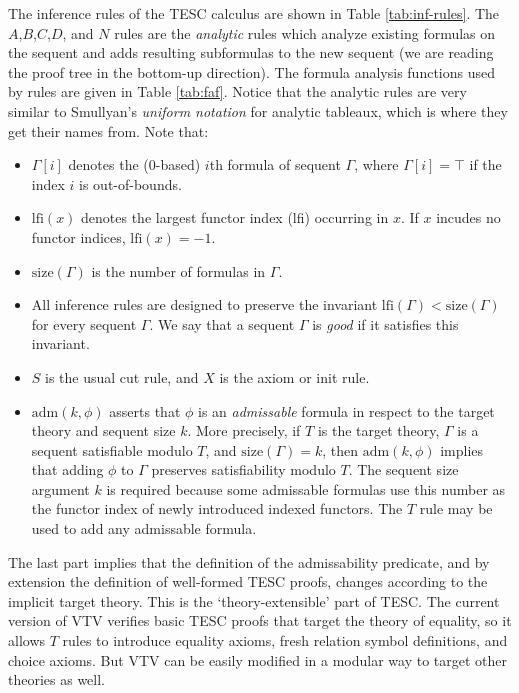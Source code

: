 \documentclass[12pt]{article}
\newcommand{\lfi}[0]{\mathrm{lfi}}
\newcommand{\size}[0]{\mathrm{size}}
\newcommand{\adm}[0]{\mathrm{adm}}
\begin{document}
The inference rules of the TESC calculus are shown in Table \ref{tab:inf-rules}.
The $A$,$B$,$C$,$D$, and $N$ rules are the \textit{analytic} rules which analyze  
existing formulas on the sequent and adds resulting subformulas to the new 
sequent (we are reading the proof tree in the bottom-up direction).
The formula analysis functions used by rules are given in Table 
\ref{tab:faf}. Notice that the analytic rules are very similar to 
Smullyan's \textit{uniform notation} for analytic tableaux, which is where 
they get their names from. Note that: 
\begin{itemize}
  \item $\Gamma[i]$ denotes the (0-based) $i$th formula of sequent $\Gamma$, 
    where $\Gamma[i] = \top$ if the index $i$ is out-of-bounds. 
  \item $\lfi(x)$ denotes the largest functor index (lfi) occurring in $x$. 
    If $x$ incudes no functor indices, $\lfi(x) = -1$.
  \item $\size(\Gamma)$ is the number of formulas in $\Gamma$.
  \item All inference rules are designed to preserve the invariant
    $\lfi(\Gamma) < \size(\Gamma)$ for every sequent $\Gamma$. We say that 
    a sequent $\Gamma$ is \textit{good} if it satisfies this invariant.
  \item $S$ is the usual cut rule, and $X$ is the axiom or init rule. 
  \item $\adm(k,\phi)$ asserts that $\phi$ is an \textit{admissable} formula in 
    respect to the target theory and sequent size $k$. More precisely, if $T$ 
    is the target theory, $\Gamma$ is a sequent satisfiable modulo $T$, and 
    $\size(\Gamma) = k$, then $\adm(k,\phi)$ implies that adding $\phi$ to 
    $\Gamma$ preserves satisfiability modulo $T$. The sequent size argument $k$ 
    is required because some admissable formulas use this number as the functor 
    index of newly introduced indexed functors. The $T$ rule may be used to add 
    any admissable formula.
\end{itemize}
The last part implies that the definition of the admissability predicate, and by 
extension the definition of well-formed TESC proofs, changes according to the implicit 
target theory. This is the `theory-extensible' part of TESC. The current version of 
VTV verifies basic TESC proofs that target the theory of equality, so it allows $T$ 
rules to introduce equality axioms, fresh relation symbol definitions, and choice axioms.
But VTV can be easily modified in a modular way to target other theories as well.
\end{document}
